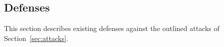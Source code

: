 \subsection{Defenses}
\label{sec:defenses}
This section describes existing defenses against the outlined attacks of Section~\ref{sec:attacks}.







